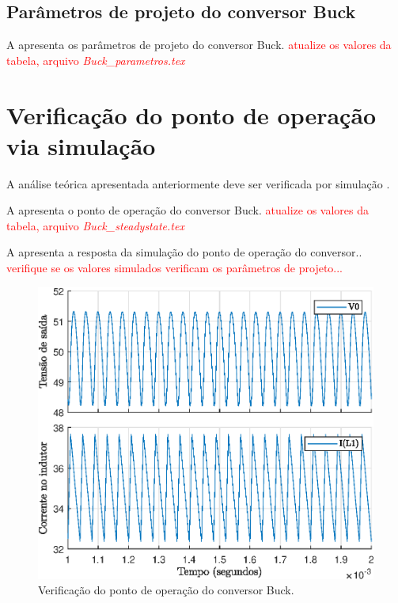 \subsection{Parâmetros de projeto do conversor Buck}


A  apresenta os parâmetros de projeto do conversor Buck.
\textcolor{red}{atualize os valores da tabela, arquivo \emph{Buck\_parametros.tex} }





\section{Verificação do ponto de operação via simulação}

A análise teórica apresentada anteriormente deve ser verificada por simulação \cite{noauthor_psim_nodate}.

A  apresenta o ponto de operação do conversor Buck.
\textcolor{red}{atualize os valores da tabela, arquivo \emph{Buck\_steadystate.tex} }




A  apresenta a resposta da simulação do ponto de operação do conversor..  \textcolor{red}{verifique se os valores simulados verificam os parâmetros de projeto...}

\begin{figure}[!ht]
	\centering
	\includegraphics[width=0.9\linewidth]{Figs/Buck-SteadyState}
	\caption{Verificação do ponto de operação do conversor Buck.}
	\label{fig:buck-steadystate}
\end{figure}




